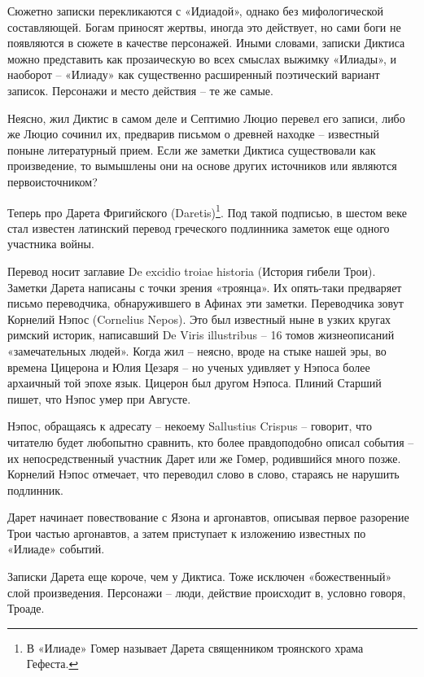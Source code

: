Сюжетно записки перекликаются с «Идиадой», однако без мифологической составляющей. Богам приносят жертвы, иногда это действует, но сами боги не появляются в сюжете в качестве персонажей. Иными словами, записки Диктиса можно представить как прозаическую во всех смыслах выжимку «Илиады», и наоборот – «Илиаду» как существенно расширенный поэтический вариант записок. Персонажи и место действия – те же самые.

Неясно, жил Диктис в самом деле и Септимио Люцио перевел его записи, либо же Люцио сочинил их, предварив письмом о древней находке – известный поныне литературный прием. Если же заметки Диктиса существовали как произведение, то вымышлены они на основе других источников или являются первоисточником?


Теперь про Дарета Фригийского (Daretis)\footnote{В «Илиаде» Гомер называет Дарета священником троянского храма Гефеста.}. Под такой подписью, в шестом веке стал известен латинский перевод греческого подлинника заметок еще одного участника войны. 

Перевод носит заглавие De excidio troiae historia (История гибели Трои). Заметки Дарета написаны с точки зрения «троянца». Их опять-таки предваряет письмо переводчика, обнаружившего в Афинах эти заметки. Переводчика зовут Корнелий Нэпос (Cornelius Nepos). Это был известный ныне в узких кругах римский историк, написавший De Viris illustribus – 16 томов жизнеописаний «замечательных людей». Когда жил – неясно, вроде на стыке нашей эры, во времена Цицерона и Юлия Цезаря – но ученых удивляет у Нэпоса более архаичный той эпохе язык. Цицерон был другом Нэпоса. Плиний Старший пишет, что Нэпос умер при Августе.

Нэпос, обращаясь к адресату – некоему Sallustius Crispus – говорит, что читателю будет любопытно сравнить, кто более правдоподобно описал события – их непосредственный участник Дарет или же Гомер, родившийся много позже. Корнелий Нэпос отмечает, что переводил слово в слово, стараясь не нарушить подлинник.

Дарет начинает повествование с Язона и аргонавтов, описывая первое разорение Трои частью аргонавтов, а затем приступает к изложению известных по «Илиаде» событий.

Записки Дарета еще короче, чем у Диктиса. Тоже исключен «божественный» слой произведения. Персонажи – люди, действие происходит в, условно говоря, Троаде.

